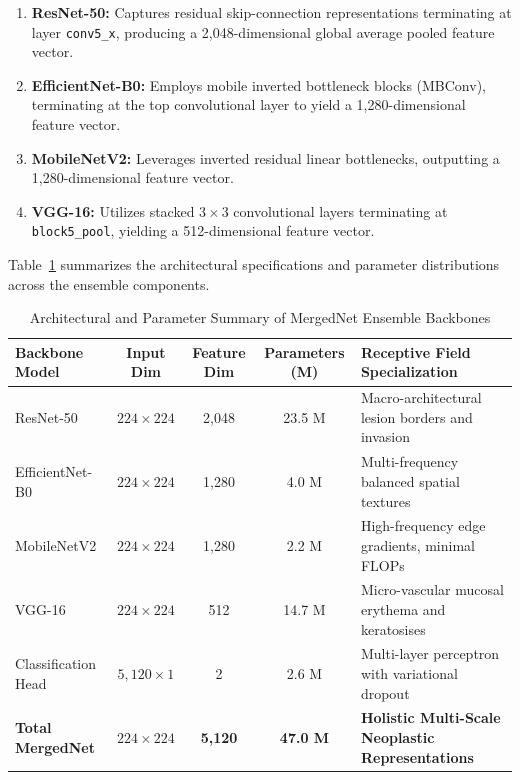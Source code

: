 \documentclass[12pt,a4paper,oneside]{report}
\begin{document}
\begin{enumerate}
    \item \textbf{ResNet-50:} Captures residual skip-connection representations terminating at layer \texttt{conv5\_x}, producing a 2,048-dimensional global average pooled feature vector.
    \item \textbf{EfficientNet-B0:} Employs mobile inverted bottleneck blocks (MBConv), terminating at the top convolutional layer to yield a 1,280-dimensional feature vector.
    \item \textbf{MobileNetV2:} Leverages inverted residual linear bottlenecks, outputting a 1,280-dimensional feature vector.
    \item \textbf{VGG-16:} Utilizes stacked $3\times 3$ convolutional layers terminating at \texttt{block5\_pool}, yielding a 512-dimensional feature vector.
\end{enumerate}

Table~\ref{tab:backbone_parameters} summarizes the architectural specifications and parameter distributions across the ensemble components.

\begin{table}[H]
\centering
\caption{Architectural and Parameter Summary of MergedNet Ensemble Backbones}
\label{tab:backbone_parameters}
\begin{tabularx}{\textwidth}{l c c c X}
\toprule
\textbf{Backbone Model} & \textbf{Input Dim} & \textbf{Feature Dim} & \textbf{Parameters (M)} & \textbf{Receptive Field Specialization} \\
\midrule
ResNet-50 & $224 \times 224$ & 2,048 & 23.5 M & Macro-architectural lesion borders and invasion \\
EfficientNet-B0 & $224 \times 224$ & 1,280 & 4.0 M & Multi-frequency balanced spatial textures \\
MobileNetV2 & $224 \times 224$ & 1,280 & 2.2 M & High-frequency edge gradients, minimal FLOPs \\
VGG-16 & $224 \times 224$ & 512 & 14.7 M & Micro-vascular mucosal erythema and keratosises \\
Classification Head & $5,120 \times 1$ & 2 & 2.6 M & Multi-layer perceptron with variational dropout \\
\midrule
\textbf{Total MergedNet} & \textbf{$224 \times 224$} & \textbf{5,120} & \textbf{47.0 M} & \textbf{Holistic Multi-Scale Neoplastic Representations} \\
\bottomrule
\end{tabularx}
\end{table}
\end{document}
